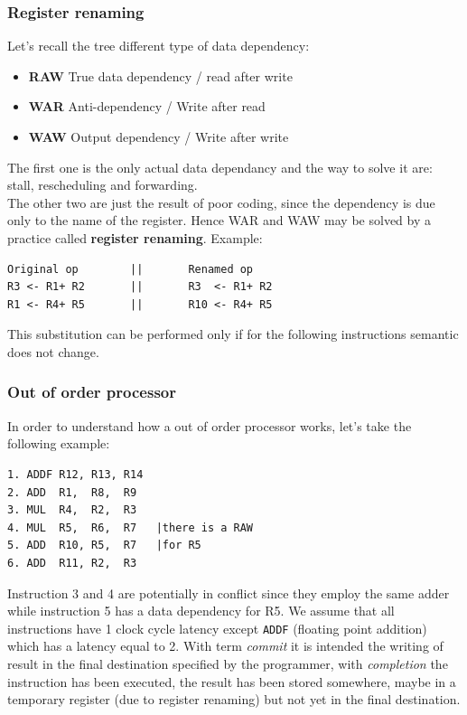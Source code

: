 \subsubsection{\Large{Register renaming}}
Let's recall the tree different type of data dependency:
\begin{itemize}
  \item \textbf{RAW} True data dependency / read after write
  \item \textbf{WAR} Anti-dependency / Write after read
  \item \textbf{WAW} Output dependency / Write after write
\end{itemize}
The first one is the only actual data dependancy and the way to solve it are:
stall, rescheduling and forwarding.\\ The other two are just the result of poor
coding, since the dependency is due only to the name of the register. Hence WAR
and WAW may be solved by a practice called \textbf{register renaming}.
Example:
\begin{verbatim}
Original op        ||       Renamed op
R3 <- R1+ R2       ||       R3  <- R1+ R2
R1 <- R4+ R5       ||       R10 <- R4+ R5
\end{verbatim}
This substitution can be performed only if for the following instructions
semantic does not change.

\subsubsection{\Large{Out of order processor}}
In order to understand how a out of order processor works, let's take the
following example:

\begin{verbatim}
1. ADDF R12, R13, R14
2. ADD  R1,  R8,  R9
3. MUL  R4,  R2,  R3
4. MUL  R5,  R6,  R7   |there is a RAW
5. ADD  R10, R5,  R7   |for R5
6. ADD  R11, R2,  R3
\end{verbatim}


Instruction 3 and 4 are potentially in conflict since they employ the same
adder while instruction 5 has a data dependency for R5. We assume that all
instructions have 1 clock cycle latency except \verb|ADDF| (floating point
addition) which has a latency equal to 2.
With term \textit{commit} it is intended the writing of result in the final
destination specified by the programmer, with \textit{completion} the
instruction has been executed, the result has been stored somewhere, maybe in a
temporary register (due to register renaming) but not yet in the final
destination.

